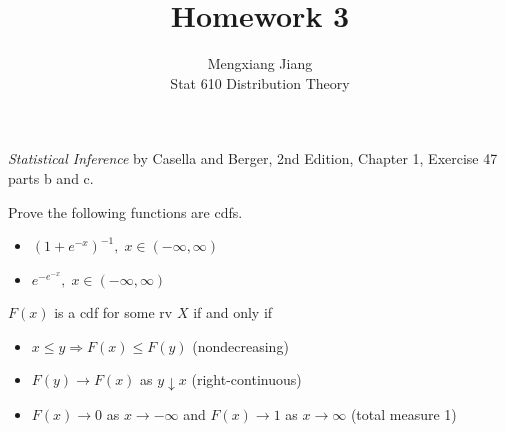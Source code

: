 \documentclass[12pt]{article}
\newenvironment{theorem}[2][Theorem]{\begin{trivlist}
\item[\hskip \labelsep {\bfseries #1}\hskip \labelsep {\bfseries #2.}]}
{\end{trivlist}}
\newenvironment{problem}[2][Problem]{\begin{trivlist}
\item[\hskip \labelsep {\bfseries #1}\hskip \labelsep {\bfseries #2.}]}
{\end{trivlist}}
\begin{document}
 
 
\title{Homework 3}%
\author{Mengxiang Jiang\\ %
Stat 610 Distribution Theory} %
 
\maketitle
 
\begin{problem}{1} %
  \textit{Statistical Inference} by Casella and Berger, 2nd Edition, Chapter 1, 
  Exercise 47 parts b and c.
  \begin{itemize}
    \item[47.] Prove the following functions are cdfs.
    \begin{itemize}
      \item [(b)] $\left(1 + e^{-x}\right)^{-1},\;x \in (-\infty, \infty)$
      \item [(c)] $e^{-e^{-x}},\; x \in (-\infty, \infty)$
    \end{itemize}

    \begin{theorem}{2.6} $F(x)$ is a cdf for some rv $X$ if and only if
      \begin{itemize}
        \item[i.] $x \le y \Rightarrow F(x) \le F(y)$ (nondecreasing)
        \item[ii.] $F(y) \rightarrow F(x)$ as $y \downarrow x$ (right-continuous)
        \item[iii.] $F(x) \rightarrow 0$ as $x \rightarrow -\infty$
        and $F(x) \rightarrow 1$ as $x \rightarrow \infty$ (total measure 1) 
      \end{itemize}
      
    \end{theorem}


\end{itemize}
\end{problem}
\end{document}
